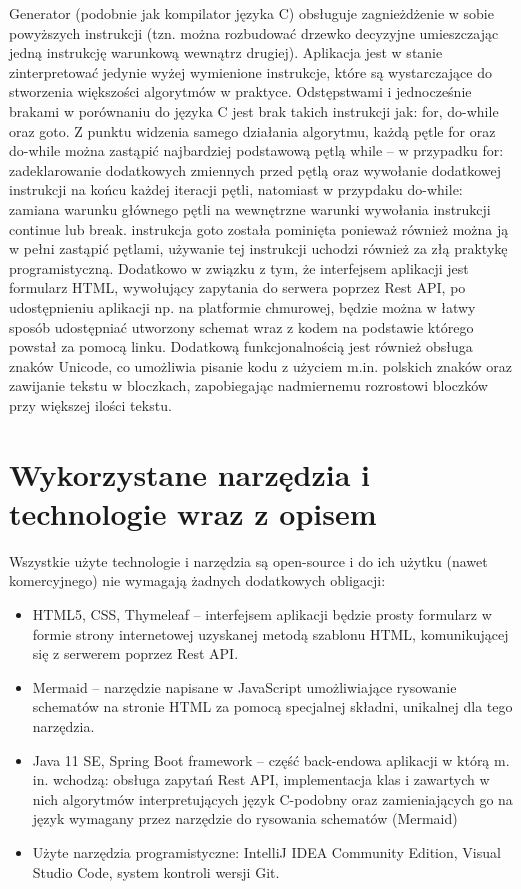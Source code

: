   Generator (podobnie jak kompilator języka C) obsługuje zagnieżdżenie w sobie powyższych instrukcji (tzn. można rozbudować drzewko decyzyjne umieszczając jedną instrukcję warunkową wewnątrz drugiej). Aplikacja jest w stanie zinterpretować jedynie wyżej wymienione instrukcje, które są wystarczające do stworzenia większości algorytmów w praktyce. Odstępstwami i jednocześnie brakami w porównaniu do języka C jest brak takich instrukcji jak: for, do-while oraz goto. Z punktu widzenia samego działania algorytmu, każdą pętle for oraz do-while można zastąpić najbardziej podstawową pętlą while -- w przypadku for: zadeklarowanie dodatkowych zmiennych przed pętlą oraz wywołanie dodatkowej instrukcji na końcu każdej iteracji pętli, natomiast w przypdaku do-while: zamiana warunku głównego pętli na wewnętrzne warunki wywołania instrukcji continue lub break. instrukcja goto została pominięta ponieważ również można ją w pełni zastąpić pętlami, używanie tej instrukcji uchodzi również za złą praktykę programistyczną.  Dodatkowo w związku z tym, że interfejsem aplikacji jest formularz HTML, wywołujący zapytania do serwera poprzez Rest API, po udostępnieniu aplikacji np. na platformie chmurowej, będzie można w łatwy sposób udostępniać utworzony schemat wraz z kodem na podstawie którego powstał za pomocą linku. Dodatkową funkcjonalnością jest również obsługa znaków Unicode, co umożliwia pisanie kodu z użyciem m.in. polskich znaków oraz zawijanie tekstu w bloczkach, zapobiegając nadmiernemu rozrostowi bloczków przy większej ilości tekstu.
  
\section{Wykorzystane narzędzia i technologie wraz z opisem}
	Wszystkie użyte technologie i narzędzia są open-source i do ich użytku (nawet komercyjnego) nie wymagają żadnych dodatkowych obligacji:

\begin{itemize}
	\item HTML5, CSS, Thymeleaf -- interfejsem aplikacji będzie prosty formularz w formie strony internetowej uzyskanej metodą szablonu HTML, komunikującej się z serwerem poprzez Rest API.	
	
	\item Mermaid -- narzędzie napisane w JavaScript umożliwiające rysowanie schematów na stronie HTML	za pomocą specjalnej składni, unikalnej dla tego narzędzia.
	
	\item Java 11 SE, Spring Boot framework -- część back-endowa aplikacji w którą m. in. wchodzą: obsługa zapytań Rest API, implementacja klas i zawartych w nich algorytmów interpretujących język C-podobny oraz zamieniających go na język wymagany przez narzędzie do rysowania schematów (Mermaid)
	
	\item Użyte narzędzia programistyczne: IntelliJ IDEA Community Edition, Visual Studio Code, system kontroli wersji Git.
		
		
\end{itemize}
	